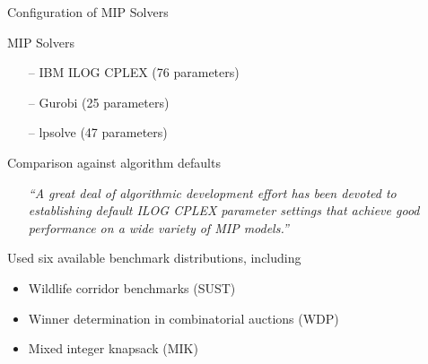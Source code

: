 \begin{frame}[c,fragile]{Configuration of MIP Solvers}


\begin{block}{MIP Solvers}
       \begin{itemize}
                \item[--] IBM ILOG CPLEX (76 parameters)
                \item[--] Gurobi (25 parameters)
                \item[--] lpsolve (47 parameters)
        \end{itemize}
\end{block}



\vspace*{-0.1cm}
\pause
\begin{block}{Comparison against algorithm defaults}

\begin{itemize}
                \item[] \emph{``A great deal of algorithmic development effort has been devoted
                      to establishing default ILOG CPLEX parameter settings that 
                      achieve good performance on a wide variety of MIP models.''}\\
\end{itemize}
\end{block}

\vspace*{-0.1cm}
\pause

\begin{block}{Used six available benchmark distributions, including}
        \begin{itemize}
        		\item Wildlife corridor benchmarks (SUST)
                \item Winner determination in combinatorial auctions (WDP)
                \item Mixed integer knapsack (MIK)
        \end{itemize}
\end{block}

\end{frame}



